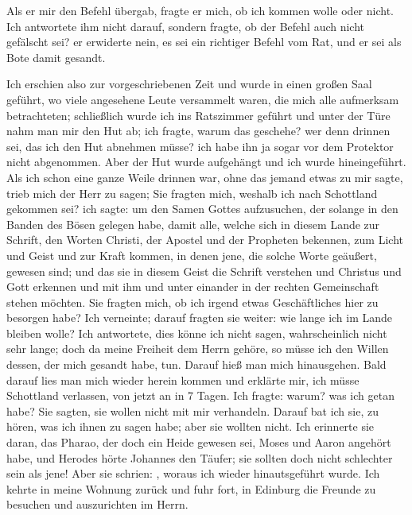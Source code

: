 

Als er mir den Befehl übergab, fragte er mich, ob ich kommen
wolle oder nicht. Ich antwortete ihm nicht darauf, sondern
fragte, ob der Befehl auch nicht gefälscht sei? er erwiderte nein,
es sei ein richtiger Befehl vom Rat, und er sei als Bote damit
gesandt. 


Ich erschien also zur vorgeschriebenen Zeit und wurde in
einen großen Saal geführt, wo viele angesehene Leute versammelt
waren, die mich alle aufmerksam betrachteten; schließlich wurde
ich ins Ratszimmer geführt und unter der Türe nahm man mir
den Hut ab; ich fragte, warum das 
geschehe? wer denn drinnen
sei, das ich den Hut abnehmen müsse? ich habe ihn ja sogar vor
dem Protektor nicht abgenommen. Aber der Hut wurde aufgehängt 
und ich wurde hineingeführt. Als ich schon eine ganze
Weile drinnen war, ohne das jemand etwas zu mir sagte, trieb
mich der Herr zu sagen; 
Sie fragten mich, weshalb ich nach Schottland gekommen sei? ich
sagte: um den Samen Gottes aufzusuchen, der solange in den
Banden des Bösen gelegen habe, damit alle, welche sich in diesem
Lande zur Schrift, den Worten Christi, der Apostel und der 
Propheten bekennen, zum Licht und Geist und zur Kraft kommen, in
denen jene, die solche Worte geäußert, gewesen sind; und das sie
in diesem Geist die Schrift verstehen und Christus und Gott 
erkennen und mit ihm und unter einander in der rechten 
Gemeinschaft stehen möchten. Sie fragten mich, ob ich irgend etwas 
Geschäftliches hier zu besorgen habe? Ich verneinte; darauf fragten
sie weiter: wie lange ich im Lande bleiben wolle? Ich antwortete,
dies könne ich nicht sagen, wahrscheinlich nicht sehr lange; doch
da meine Freiheit dem Herrn gehöre, so müsse ich den Willen
dessen, der mich gesandt habe, tun. Darauf hieß man mich 
hinausgehen. Bald darauf lies man mich wieder herein kommen
und erklärte mir, ich müsse Schottland verlassen, von jetzt an in
7 Tagen. Ich fragte: warum? was ich getan habe? Sie sagten,
sie wollen nicht mit mir verhandeln. Darauf bat ich sie, zu hören,
was ich ihnen zu sagen habe; aber sie wollten nicht. Ich 
erinnerte sie daran, das Pharao, der doch ein Heide gewesen sei,
Moses und Aaron angehört habe, und Herodes hörte Johannes
den Täufer; sie sollten doch nicht schlechter sein als jene! Aber
sie schrien: , woraus ich wieder hinautsgeführt
wurde. Ich kehrte in meine Wohnung zurück und fuhr fort, in
Edinburg die Freunde zu besuchen und auszurichten 
im Herrn.


